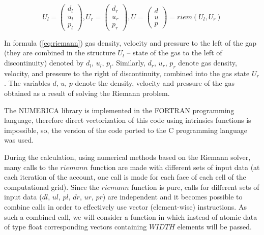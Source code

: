 \documentclass[
11pt,%
tightenlines,%
twoside,%
onecolumn,%
nofloats,%
nobibnotes,%
nofootinbib,%
superscriptaddress,%
noshowpacs,%
centertags]%
{revtex4}
\begin{document}
\begin{equation}\label{eq:riemann}
U_l = \left( \begin{array}{ccc} d_l \\ u_l \\ p_l \end{array} \right),
U_r = \left( \begin{array}{ccc} d_r \\ u_r \\ p_r \end{array} \right),
U = \left( \begin{array}{ccc} d \\ u \\ p \end{array} \right) = riem(U_l, U_r)
\end{equation}

In formula (\ref{eq:riemann}) gas density, velocity and pressure to the left of the gap (they are combined in the structure $U_l$ -- state of the gas to the left of discontinuity) denoted by $d_l$, $u_l$, $p_l$.
Similarly, $d_r$, $u_r$, $p_r$ denote gas density, velocity, and pressure to the right of discontinuity, combined into the gas state $U_r$.
The variables $d$, $u$, $p$ denote the density, velocity and pressure of the gas obtained as a result of solving the Riemann problem.

The NUMERICA library is implemented in the FORTRAN programming language, therefore direct vectorization of this code using intrinsics functions is impossible, so, the version of the code ported to the C programming language was used.

During the calculation, using numerical methods based on the Riemann solver, many calls to the $riemann$ function are made with different sets of input data (at each iteration of the account, one call is made for each face of each cell of the computational grid).
Since the $riemann$ function is pure, calls for different sets of input data ($dl$, $ul$, $pl$, $dr$, $ur$, $pr$) are independent and it becomes possible to combine calls in order to effectively use vector (element-wise) instructions.
As such a combined call, we will consider a function in which instead of atomic data of type float corresponding vectors containing $WIDTH$ elements will be passed.
\end{document}
